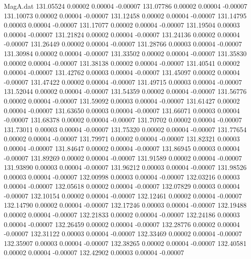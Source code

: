 \begin{filecontents}{MagA.dat}
 131.05524    0.00002    0.00004   -0.00007
 131.07786    0.00002    0.00004   -0.00007
 131.10073    0.00002    0.00004   -0.00007
 131.12458    0.00002    0.00004   -0.00007
 131.14795    0.00003    0.00004   -0.00007
 131.17077    0.00002    0.00004   -0.00007
 131.19504    0.00003    0.00004   -0.00007
 131.21824    0.00002    0.00004   -0.00007
 131.24136    0.00002    0.00004   -0.00007
 131.26449    0.00002    0.00004   -0.00007
 131.28766    0.00003    0.00004   -0.00007
 131.30984    0.00002    0.00004   -0.00007
 131.33502    0.00002    0.00004   -0.00007
 131.35830    0.00002    0.00004   -0.00007
 131.38138    0.00002    0.00004   -0.00007
 131.40541    0.00002    0.00004   -0.00007
 131.42762    0.00003    0.00004   -0.00007
 131.45097    0.00002    0.00004   -0.00007
 131.47422    0.00002    0.00004   -0.00007
 131.49715    0.00003    0.00004   -0.00007
 131.52044    0.00002    0.00004   -0.00007
 131.54359    0.00002    0.00004   -0.00007
 131.56776    0.00002    0.00004   -0.00007
 131.59092    0.00003    0.00004   -0.00007
 131.61427    0.00002    0.00004   -0.00007
 131.63650    0.00003    0.00004   -0.00007
 131.66071    0.00003    0.00004   -0.00007
 131.68378    0.00002    0.00004   -0.00007
 131.70702    0.00002    0.00004   -0.00007
 131.73011    0.00003    0.00004   -0.00007
 131.75320    0.00002    0.00004   -0.00007
 131.77654    0.00002    0.00004   -0.00007
 131.79971    0.00002    0.00004   -0.00007
 131.82321    0.00003    0.00004   -0.00007
 131.84647    0.00002    0.00004   -0.00007
 131.86945    0.00003    0.00004   -0.00007
 131.89269    0.00002    0.00004   -0.00007
 131.91589    0.00002    0.00004   -0.00007
 131.93890    0.00003    0.00004   -0.00007
 131.96212    0.00003    0.00004   -0.00007
 131.98526    0.00003    0.00004   -0.00007
 132.00998    0.00003    0.00004   -0.00007
 132.03216    0.00003    0.00004   -0.00007
 132.05618    0.00002    0.00004   -0.00007
 132.07829    0.00003    0.00004   -0.00007
 132.10154    0.00002    0.00004   -0.00007
 132.12461    0.00002    0.00004   -0.00007
 132.14790    0.00002    0.00004   -0.00007
 132.17246    0.00003    0.00004   -0.00007
 132.19488    0.00002    0.00004   -0.00007
 132.21833    0.00002    0.00004   -0.00007
 132.24186    0.00003    0.00004   -0.00007
 132.26459    0.00002    0.00004   -0.00007
 132.28776    0.00002    0.00004   -0.00007
 132.31122    0.00003    0.00004   -0.00007
 132.33469    0.00002    0.00004   -0.00007
 132.35907    0.00003    0.00004   -0.00007
 132.38265    0.00002    0.00004   -0.00007
 132.40581    0.00002    0.00004   -0.00007
 132.42902    0.00003    0.00004   -0.00007

\end{filecontents}
